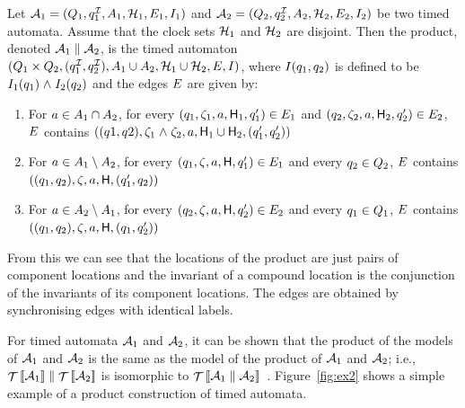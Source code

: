 {Let $\AA_1 = (\tglocs_1, \tgiloc_1, \Actions_1, \tgclks_1, \tgedges_1, \tginv_1)$
and $\AA_2 = (\tglocs_2, \tgiloc_2, \Actions_2, \tgclks_2, \tgedges_2, \tginv_2)$
be two timed automata. Assume that the clock sets $\tgclks_1$ and $\tgclks_2$
are disjoint. Then the product, denoted $\AA_1 \parallel \AA_2$, is the timed
automaton $(\tglocs_1 \cross
\tglocs_2, (\tgiloc_1,\tgiloc_2), \Actions_1 \cup \Actions_2, \tgclks_1 \cup \tgclks_2, \tgedges, \tginv)$, where 
$I(q_1,q_2)$ is defined to be $I_1(q_1) \mathrel{\wedge}
I_2(q_2)$ and the edges $E$ are given by:
\begin{enumerate}
\item For $a \in A_1 \cap A_2$, for every 
$(q_1,{\zeta}_1,a,{\sf H}_1,q'_1) \in E_1$ and $(q_2,
{\zeta}_2,a,{\sf H}_2,q'_2) \in
E_2$, $E$ contains $((q1,q2),{\zeta}_1 \mathrel{\wedge} {\zeta}_2,a,{\sf H}_1 \cup {\sf H}_2,(q'_1,q'_2))$
\item For $a \in A_1 \setminus A_2$, for every 
$(q_1,{\zeta},a,{\sf H},q'_1) \in E_1$ and every 
$q_2 \in Q_2$, $E$ contains
$((q_1,q_2),{\zeta},a,{\sf H},(q'_1,q_2))$
\item For $a \in A_2 \setminus A_1$, for every
$(q_2,{\zeta},a,{\sf H},q'_2) \in E_2$ and every 
$q_1 \in Q_1$, $E$ contains
$((q_1,q_2),{\zeta},a,{\sf H},(q_1,q'_2))$
\end{enumerate}

From this we can see that the locations of the product are just pairs of
component locations and the invariant of a compound location is the
conjunction of the invariants of its component locations. The edges are
obtained by synchronising edges with identical labels.

For timed automata $\AA_1$ and $\AA_2$, it can be shown that the
product of the models of $\AA_1$ and $\AA_2$ is the same as the model
of the product of $\AA_1$ and $\AA_2$; i.e., $\TSys{\AA_1} \parallel
\TSys{\AA_2}$ is isomorphic to $\TSys{\AA_1 \parallel
\AA_2}$~\cite{ad:94}.  Figure~\ref{fig:ex2} shows a simple example of
a product construction of timed automata.

}
